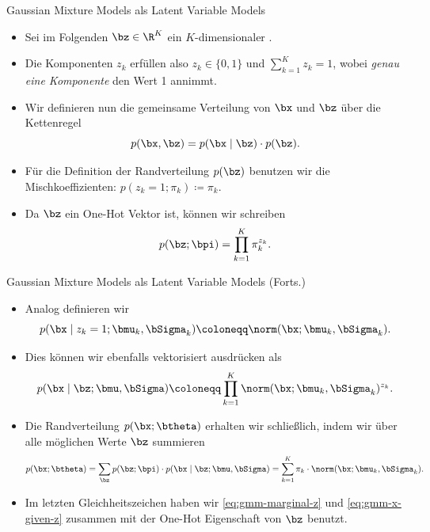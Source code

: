 \begin{frame}{Gaussian Mixture Models als Latent Variable Models}{}
	\begin{itemize}
		\item Sei im Folgenden $\bz \in \R^K$ ein $K$-dimensionaler .
		\item Die Komponenten $z_k$ erfüllen also $z_k \in \{ 0, 1 \}$ und $\sum_{k=1}^K z_k = 1$,
			wobei \textit{genau eine Komponente} den Wert 1 annimmt.
		\item Wir definieren nun die gemeinsame Verteilung von $\bx$ und $\bz$ über die Kettenregel
		\begin{equation*}
			p(\bx, \bz) = p(\bx \mid \bz) \cdot p(\bz).
		\end{equation*}
		\item Für die Definition der Randverteilung $p(\bz)$ benutzen wir die Mischkoeffizienten: $p(z_k = 1; \pi_k) \coloneqq \pi_k$.
		\item Da $\bz$ ein One-Hot Vektor ist, können wir schreiben
		\begin{equation} \label{eq:gmm-marginal-z}
			p(\bz; \bpi) = \prod_{k=1}^K \pi_k^{z_k}.
		\end{equation}
	\end{itemize}
\end{frame}


\begin{frame}{Gaussian Mixture Models als Latent Variable Models (Forts.)}{}
	\begin{itemize}
		\item Analog definieren wir
		\begin{equation*}
			p(\bx \mid z_k = 1; \bmu_k, \bSigma_k) \coloneqq \norm(\bx; \bmu_k, \bSigma_k).
		\end{equation*}
		\item Dies können wir ebenfalls vektorisiert ausdrücken als
		\begin{equation} \label{eq:gmm-x-given-z}
			p(\bx \mid \bz; \bmu, \bSigma) \coloneqq \prod_{k=1}^K \norm(\bx; \bmu_k, \bSigma_k)^{z_k}.
		\end{equation}
		\item Die Randverteilung $p(\bx; \btheta)$ erhalten wir schließlich, indem wir über alle möglichen Werte $\bz$ summieren
		\begin{equation}
			p(\bx; \btheta) = \sum_{\bz} p(\bz; \bpi) \cdot p(\bx \mid \bz; \bmu, \bSigma)
				= \sum_{k=1}^K \pi_k \cdot \norm(\bx; \bmu_k, \bSigma_k).
		\end{equation}
		\item Im letzten Gleichheitszeichen haben wir \eqref{eq:gmm-marginal-z} und \eqref{eq:gmm-x-given-z}
			zusammen mit der One-Hot Eigenschaft von $\bz$ benutzt.
	\end{itemize}
\end{frame}


